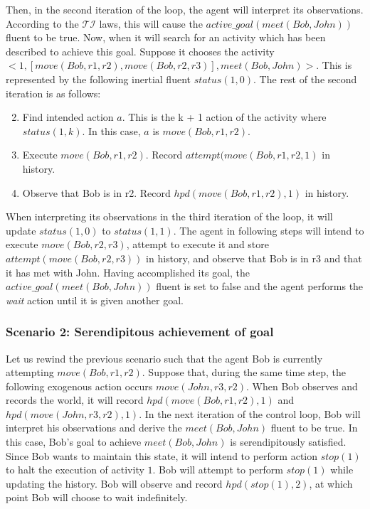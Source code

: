 Then, in the second iteration of the loop, the agent will interpret its observations.
According to the $\mathcal{TI}$ laws, this will cause the $active\_goal(meet(Bob, John))$ fluent to be true.
Now, when it will search for an activity which has been described to achieve this goal.
Suppose it chooses the activity $<1, [move(Bob, r1,r2), move(Bob, r2, r3)],meet(Bob,John)>$.
This is represented by the following inertial fluent $status(1,0)$.
The rest of the second iteration is as follows:

\begin{enumerate}
    \setcounter{enumi}{1}
    \item Find intended action $a$.
        This is the k + 1 action of the activity where $status(1, k)$.
        In this case, $a$ is $move(Bob, r1, r2)$.
    \item Execute $move(Bob, r1, r2)$.
        Record $attempt(move(Bob, r1, r2, 1)$ in history.
    \item Observe that Bob is in r2.
        Record $hpd(move(Bob, r1, r2),1)$ in history.
\end{enumerate}

When interpreting its observations in the third iteration of the loop, it will update $status(1,0)$ to $status(1,1)$.
The agent in following steps will intend to execute $move(Bob, r2, r3)$, attempt to execute it and store $attempt(move(Bob, r2, r3))$ in history, and observe that Bob is in r3 and that it has met with John.
Having accomplished its goal, the $active\_goal(meet(Bob, John))$ fluent is set to false and the agent performs the \textit{wait} action until it is given another goal.

\subsubsection{Scenario 2: Serendipitous achievement of goal~\citep{blount_towards_2014}}
\label{subsubsec:aia_scenario_2}

Let us rewind the previous scenario such that the agent Bob is currently attempting $move(Bob, r1, r2)$.
Suppose that, during the same time step, the following exogenous action occurs $move(John, r3, r2)$.
When Bob observes and records the world, it will record $hpd(move(Bob, r1, r2), 1)$ and $hpd(move(John,r3,r2), 1)$.
In the next iteration of the control loop, Bob will interpret his observations and derive the $meet(Bob, John)$ fluent to be true.
In this case, Bob's goal to achieve $meet(Bob, John)$ is serendipitously satisfied.
Since Bob wants to maintain this state, it will intend to perform action $stop(1)$ to halt the execution of activity $1$.
Bob will attempt to perform $stop(1)$ while updating the history.
Bob will observe and record $hpd(stop(1), 2)$, at which point Bob will choose to wait indefinitely.

